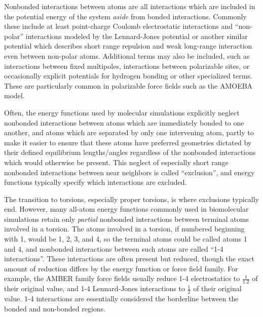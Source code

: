 \documentclass[9pt,bestpractices]{livecoms}
\begin{document}
Nonbonded interactions between atoms are all interactions which are included in the potential energy of the system \emph{aside} from bonded interactions.  
Commonly these include at least point-charge Coulomb electrostatic interactions and ``non-polar'' interactions modeled by the Lennard-Jones potential or another similar potential which describes short range repulsion and weak long-range interaction even between non-polar atoms.
Additional terms may also be included, such as interactions between fixed multipoles, interactions between polarizable sites, or occasionally explicit potentials for hydrogen bonding or other specialized terms.
These are particularly common in polarizable force fields such as the AMOEBA model.

Often, the energy functions used by molecular simulations explicitly neglect nonbonded interactions between atoms which are immediately bonded to one
another, and atoms which are separated by only one intervening atom, partly to make it easier to ensure that these atoms have preferred geometries dictated by their defined equilibrium lengths/angles regardless of the nonbonded interactions which would otherwise be present.
This neglect of especially short range nonbonded interactions between near neighbors is called ``exclusion'', and energy functions typically specify which interactions are excluded.

The transition to torsions, especially proper torsions, is where exclusions typically end.
However, many all-atom energy functions commonly used in biomolecular simulations retain only \emph{partial} nonbonded interactions between terminal atoms involved in a torsion. 
The atoms involved in a torsion, if numbered beginning with 1, would be 1, 2, 3, and 4, so the terminal atoms could be called atoms 1 and 4, and nonbonded interactions between such atoms are called ``1-4 interactions''. 
These interactions are often present but reduced, though the exact amount of reduction differs by the energy function or force field family.
For example, the AMBER family force fields usually reduce 1-4 electrostatics to $\frac{1}{1.2}$ of their original value, and 1-4 Lennard-Jones interactions to $\frac{1}{2}$ of their original value.
1-4 interactions are essentially considered the borderline between the bonded and non-bonded regions.


\end{document}
